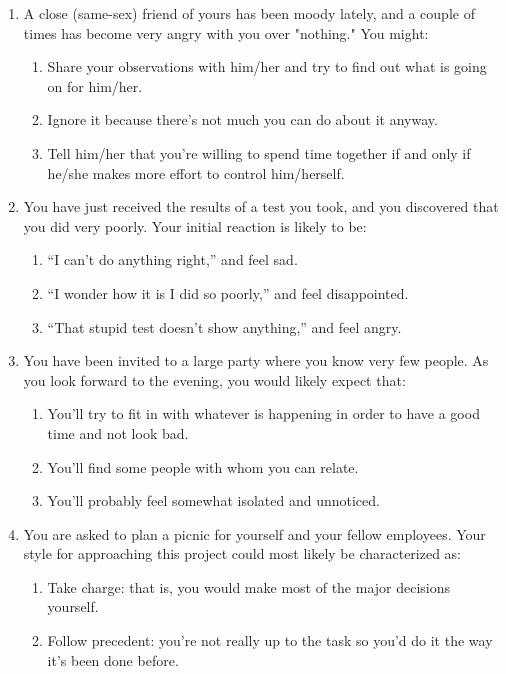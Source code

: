 \begin{enumerate}
\begin{enumerate}
    \end{enumerate}
    \item A close (same-sex) friend of yours has been moody lately, and a couple of times has become very angry with you over "nothing." You might:
    \begin{enumerate}
        \item Share your observations with him/her and try to find out what is going on for him/her.
        \item Ignore it because there's not much you can do about it anyway.
        \item Tell him/her that you're willing to spend time together if and only if he/she makes more effort to control him/herself.
    \end{enumerate}
    \item You have just received the results of a test you took, and you discovered that you did very poorly. Your initial reaction is likely to be:
    \begin{enumerate}
        \item ``I can't do anything right,'' and feel sad.
        \item ``I wonder how it is I did so poorly,'' and feel disappointed.
        \item ``That stupid test doesn't show anything,'' and feel angry.
    \end{enumerate}
    \item You have been invited to a large party where you know very few people. As you look forward to the evening, you would likely expect that:
    \begin{enumerate}
        \item You'll try to fit in with whatever is happening in order to have a good time and not look bad.
        \item You'll find some people with whom you can relate.
        \item You'll probably feel somewhat isolated and unnoticed.
    \end{enumerate}
    \item You are asked to plan a picnic for yourself and your fellow employees. Your style for approaching this project could most likely be characterized as:
    \begin{enumerate}
        \item Take charge: that is, you would make most of the major decisions yourself.
        \item Follow precedent: you're not really up to the task so you'd do it the way it's been done before.

\end{enumerate}
\end{enumerate}
